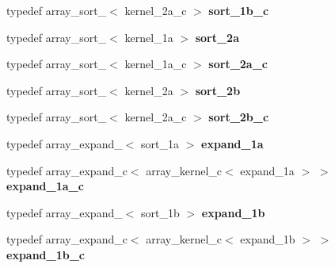 \begin{DoxyCompactItemize}
\item 
\hypertarget{classdlib_1_1array_aab01d3f68430e4eb706cf1120111c4ad}{
typedef array\_\-sort\_$<$ kernel\_\-2a\_\-c $>$ {\bfseries sort\_\-1b\_\-c}}
\label{classdlib_1_1array_aab01d3f68430e4eb706cf1120111c4ad}

\item 
\hypertarget{classdlib_1_1array_a9b73b3e6c395f37de471a1c126fdfc5c}{
typedef array\_\-sort\_$<$ kernel\_\-1a $>$ {\bfseries sort\_\-2a}}
\label{classdlib_1_1array_a9b73b3e6c395f37de471a1c126fdfc5c}

\item 
\hypertarget{classdlib_1_1array_ac5f19e38041d0ce69ede54f602d06e1b}{
typedef array\_\-sort\_$<$ kernel\_\-1a\_\-c $>$ {\bfseries sort\_\-2a\_\-c}}
\label{classdlib_1_1array_ac5f19e38041d0ce69ede54f602d06e1b}

\item 
\hypertarget{classdlib_1_1array_a47bbbbe6627a7b091315bd887352f1a3}{
typedef array\_\-sort\_$<$ kernel\_\-2a $>$ {\bfseries sort\_\-2b}}
\label{classdlib_1_1array_a47bbbbe6627a7b091315bd887352f1a3}

\item 
\hypertarget{classdlib_1_1array_a82877adabfb3dab98a6092b3c5b384f2}{
typedef array\_\-sort\_$<$ kernel\_\-2a\_\-c $>$ {\bfseries sort\_\-2b\_\-c}}
\label{classdlib_1_1array_a82877adabfb3dab98a6092b3c5b384f2}

\item 
\hypertarget{classdlib_1_1array_a8bef642089b1615c619d7dbb841b489e}{
typedef array\_\-expand\_$<$ sort\_\-1a $>$ {\bfseries expand\_\-1a}}
\label{classdlib_1_1array_a8bef642089b1615c619d7dbb841b489e}

\item 
\hypertarget{classdlib_1_1array_a3c8253f1535d9e849f7130eb81acbc28}{
typedef array\_\-expand\_\-c$<$ array\_\-kernel\_\-c$<$ expand\_\-1a $>$ $>$ {\bfseries expand\_\-1a\_\-c}}
\label{classdlib_1_1array_a3c8253f1535d9e849f7130eb81acbc28}

\item 
\hypertarget{classdlib_1_1array_a74db12d11aab1af94dfcbff8b9d4cbe5}{
typedef array\_\-expand\_$<$ sort\_\-1b $>$ {\bfseries expand\_\-1b}}
\label{classdlib_1_1array_a74db12d11aab1af94dfcbff8b9d4cbe5}

\item 
\hypertarget{classdlib_1_1array_af116da0897cd6dfd8cc5216fa9ffdb19}{
typedef array\_\-expand\_\-c$<$ array\_\-kernel\_\-c$<$ expand\_\-1b $>$ $>$ {\bfseries expand\_\-1b\_\-c}}
\label{classdlib_1_1array_af116da0897cd6dfd8cc5216fa9ffdb19}


\end{DoxyCompactItemize}
